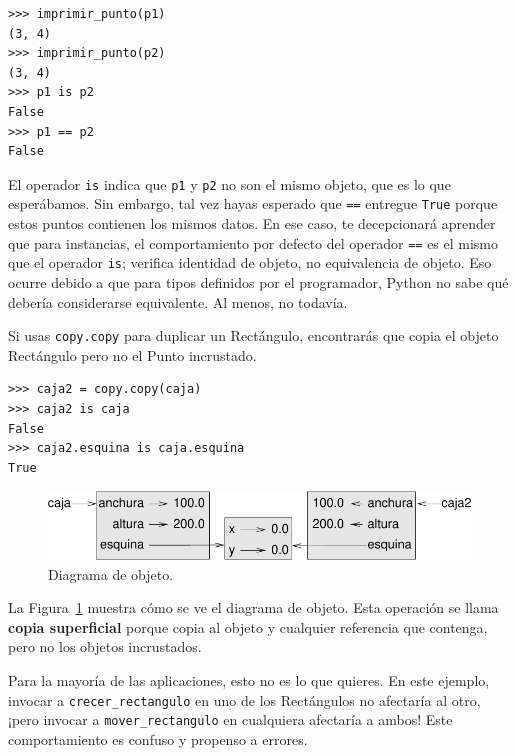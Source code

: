 \documentclass[10pt]{book}
\begin{document}
\begin{verbatim}
>>> imprimir_punto(p1)
(3, 4)
>>> imprimir_punto(p2)
(3, 4)
>>> p1 is p2
False
>>> p1 == p2
False
\end{verbatim}
%
El operador {\tt is} indica que {\tt p1} y {\tt p2} no son el
mismo objeto, que es lo que esperábamos.  Sin embargo, tal vez hayas esperado
que {\tt ==} entregue {\tt True} porque estos puntos contienen los mismos
datos.  En ese caso, te decepcionará aprender que para
instancias, el comportamiento por defecto del operador {\tt ==} es el mismo
que el operador {\tt is}; verifica identidad de objeto, no equivalencia
de objeto.  Eso ocurre debido a que para tipos definidos por el programador, Python no
sabe qué debería considerarse equivalente.  Al menos, no todavía.

Si usas {\tt copy.copy} para duplicar un Rectángulo, encontrarás
que copia el objeto Rectángulo pero no el Punto incrustado.

\begin{verbatim}
>>> caja2 = copy.copy(caja)
>>> caja2 is caja
False
>>> caja2.esquina is caja.esquina
True
\end{verbatim}

\begin{figure}
\centerline
{\includegraphics[scale=0.8]{figs/rectangle2.pdf}}
\caption{Diagrama de objeto.}
\label{fig.rectangle2}
\end{figure}

La Figura~\ref{fig.rectangle2} muestra cómo se ve el diagrama de objeto.
Esta operación se llama {\bf copia superficial} porque copia al
objeto y cualquier referencia que contenga, pero no los objetos incrustados.

Para la mayoría de las aplicaciones, esto no es lo que quieres.  En este ejemplo,
invocar a \verb"crecer_rectangulo" en uno de los Rectángulos no
afectaría al otro, ¡pero invocar a \verb"mover_rectangulo" en cualquiera
afectaría a ambos!  Este comportamiento es confuso y propenso a errores.
\end{document}
